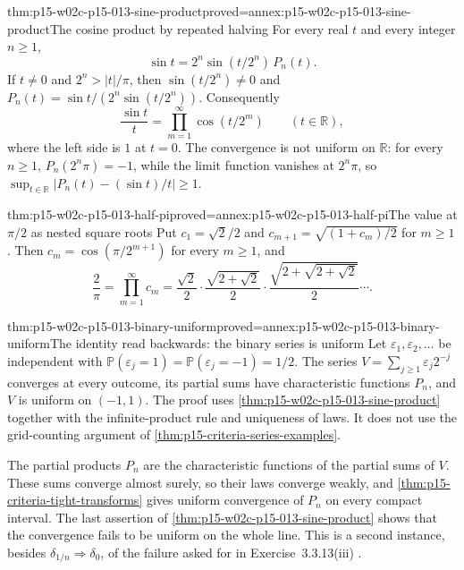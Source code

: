 \begin{hbtheorem}{thm:p15-w02c-p15-013-sine-product}{proved=annex:p15-w02c-p15-013-sine-product}{The cosine product by repeated halving}
For every real \(t\) and every integer \(n\geq1\),
\[
 \sin t=2^n\sin(t/2^n)\,P_n(t).
\]
If \(t\neq0\) and \(2^n>|t|/\pi\), then \(\sin(t/2^n)\neq0\) and
\(P_n(t)=\sin t/(2^n\sin(t/2^n))\). Consequently
\[
 \frac{\sin t}{t}=\prod_{m=1}^{\infty}\cos(t/2^m)\qquad(t\in\mathbb R),
\]
where the left side is \(1\) at \(t=0\). The convergence is not uniform on
\(\mathbb R\): for every \(n\geq1\), \(P_n(2^n\pi)=-1\), while the limit
function vanishes at \(2^n\pi\), so
\(\sup_{t\in\mathbb R}|P_n(t)-(\sin t)/t|\geq1\).
\end{hbtheorem}

\begin{hbcorollary}{thm:p15-w02c-p15-013-half-pi}{proved=annex:p15-w02c-p15-013-half-pi}{The value at \(\pi/2\) as nested square roots}
Put \(c_1=\sqrt2/2\) and \(c_{m+1}=\sqrt{(1+c_m)/2}\) for \(m\geq1\). Then
\(c_m=\cos(\pi/2^{m+1})\) for every \(m\geq1\), and
\[
 \frac{2}{\pi}=\prod_{m=1}^{\infty}c_m
 =\frac{\sqrt2}{2}\cdot\frac{\sqrt{2+\sqrt2}}{2}\cdot
  \frac{\sqrt{2+\sqrt{2+\sqrt2}}}{2}\cdots .
\]
\end{hbcorollary}

\begin{hbcorollary}{thm:p15-w02c-p15-013-binary-uniform}{proved=annex:p15-w02c-p15-013-binary-uniform}{The identity read backwards: the binary series is uniform}
Let \(\varepsilon_1,\varepsilon_2,\dots\) be independent with
\(\mathbb P(\varepsilon_j=1)=\mathbb P(\varepsilon_j=-1)=1/2\). The series
\(V=\sum_{j\geq1}\varepsilon_j2^{-j}\) converges at every outcome, its partial
sums have characteristic functions \(P_n\), and \(V\) is uniform on
\((-1,1)\). The proof uses \cref{thm:p15-w02c-p15-013-sine-product} together
with the infinite-product rule and uniqueness of laws. It does not use the
grid-counting argument of \cref{thm:p15-criteria-series-examples}.
\end{hbcorollary}

The partial products \(P_n\) are the characteristic functions of the partial
sums of \(V\). These sums converge almost surely, so their laws converge
weakly, and \cref{thm:p15-criteria-tight-transforms} gives uniform
convergence of \(P_n\) on every compact interval. The last assertion of
\cref{thm:p15-w02c-p15-013-sine-product} shows that the convergence fails
to be uniform on the whole line. This is a second instance, besides
\(\delta_{1/n}\Rightarrow\delta_0\), of the failure asked for in Exercise~3.3.13(iii)
\cite[p.~136]{DurrettPTEAuthor2019}.

